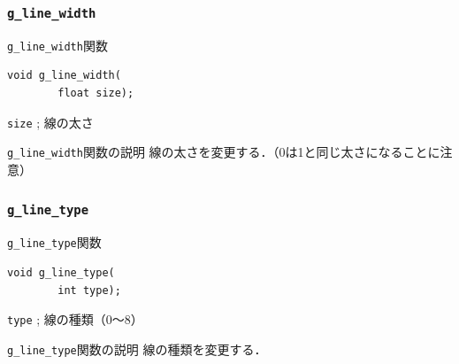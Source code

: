 \documentclass[platex,a4paper,12pt]{jsarticle}%
\begin{document}
\subsubsection{\texttt{g\_line\_width}}

\begin{itembox}[l]{\texttt{g\_line\_width}関数}
\begin{verbatim}
void g_line_width(
        float size);
\end{verbatim}
\verb|size| ; 線の太さ\\
\end{itembox}

\begin{itembox}[l]{\texttt{g\_line\_width}関数の説明}
線の太さを変更する．（0は1と同じ太さになることに注意）
\end{itembox}

\subsubsection{\texttt{g\_line\_type}}

\begin{itembox}[l]{\texttt{g\_line\_type}関数}
\begin{verbatim}
void g_line_type(
        int type);
\end{verbatim}
\verb|type| ; 線の種類（0〜8）\\
\end{itembox}

\begin{itembox}[l]{\texttt{g\_line\_type}関数の説明}
線の種類を変更する．
\end{itembox}

\begin{figure}[htb]
\end{figure}



\clearpage
\end{document}
